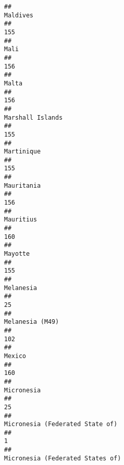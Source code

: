 \documentclass[]{article}
\begin{document}
\begin{verbatim}
##                                                                                     Maldives 
##                                                                                          155 
##                                                                                         Mali 
##                                                                                          156 
##                                                                                        Malta 
##                                                                                          156 
##                                                                             Marshall Islands 
##                                                                                          155 
##                                                                                   Martinique 
##                                                                                          155 
##                                                                                   Mauritania 
##                                                                                          156 
##                                                                                    Mauritius 
##                                                                                          160 
##                                                                                      Mayotte 
##                                                                                          155 
##                                                                                    Melanesia 
##                                                                                           25 
##                                                                              Melanesia (M49) 
##                                                                                          102 
##                                                                                       Mexico 
##                                                                                          160 
##                                                                                   Micronesia 
##                                                                                           25 
##                                                              Micronesia (Federated State of) 
##                                                                                            1 
##                                                             Micronesia (Federated States of) 

\end{verbatim}
\end{document}
